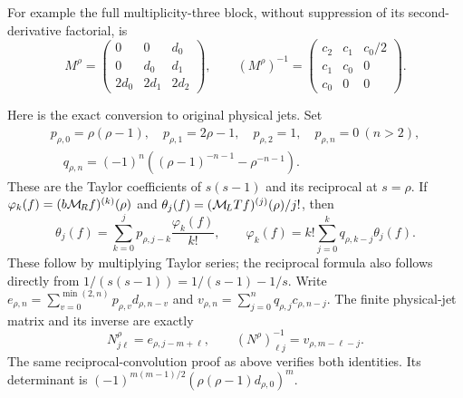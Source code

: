 For example the full multiplicity-three block, without suppression
of its second-derivative factorial, is
\[
 M^\rho=\begin{pmatrix}0&0&d_0\\0&d_0&d_1\\
                         2d_0&2d_1&2d_2\end{pmatrix},\qquad
 (M^\rho)^{-1}=\begin{pmatrix}c_2&c_1&c_0/2\\
                           c_1&c_0&0\\c_0&0&0\end{pmatrix}.
\]

Here is the exact conversion to original physical jets. Set
\begin{equation}\label{mburn:eq:pq}
 \begin{gathered}
 p_{\rho,0}=\rho(\rho-1),\quad p_{\rho,1}=2\rho-1,
 \quad p_{\rho,2}=1,\quad p_{\rho,n}=0\ (n>2),\\
 \quad q_{\rho,n}=(-1)^n\left((\rho-1)^{-n-1}-\rho^{-n-1}\right).
 \end{gathered}
\end{equation}
These are the Taylor coefficients of $s(s-1)$ and its reciprocal
at $s=\rho$. If $\varphi_k(f)=(b\mathcal M_{\!R} f)^{(k)}(\rho)$ and
$\theta_j(f)=(\mathcal M_{\!L} Tf)^{(j)}(\rho)/j!$, then
\begin{equation}\label{mburn:eq:jet-conversion}
 \theta_j(f)=\sum_{k=0}^j p_{\rho,j-k}\frac{\varphi_k(f)}{k!},
 \qquad
 \varphi_k(f)=k!\sum_{j=0}^kq_{\rho,k-j}\theta_j(f).
\end{equation}
These follow by multiplying Taylor series; the reciprocal formula
also follows directly from
$1/(s(s-1))=1/(s-1)-1/s$.
Write $e_{\rho,n}=\sum_{v=0}^{\min(2,n)}p_{\rho,v}d_{\rho,n-v}$
and $v_{\rho,n}=\sum_{j=0}^nq_{\rho,j}c_{\rho,n-j}$.
The finite physical-jet matrix and its inverse are exactly
\begin{equation}\label{mburn:eq:physical-jet}
 N^\rho_{j\ell}=e_{\rho,j-m+\ell},\qquad
 (N^\rho)^{-1}_{\ell j}=v_{\rho,m-\ell-j}.
\end{equation}
The same reciprocal-convolution proof as above verifies both
identities. Its determinant is
$(-1)^{m(m-1)/2}(\rho(\rho-1)d_{\rho,0})^m$.

